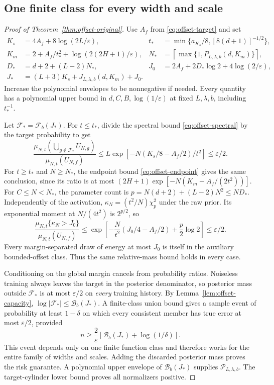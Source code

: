 \subsection{One finite class for every width and scale}
\begin{proof}[Proof of Theorem~\ref{thm:offset-original}]
Use $A_f$ from \eqref{eq:offset-target} and set
\begin{align*}
 K_s&=4A_f+8\log(2L/\varepsilon),&
 t_*&=\min\{a_{K_s}/8,[8(d+1)]^{-1/2}\},\\
 K_m&=2+A_f/t_*^2+\log(2(2H+1)/\varepsilon),&
 N_*&=\left\lceil\max\{1,P_{L,\lambda,b}(d,K_m)\}\right\rceil,\\
 D_*&=d+2+(L-2)N_*,&
 J_0&=2A_f+2D_*\log2+4\log(2/\varepsilon),\\
 J_*&=(L+3)K_s+J_{L,\lambda,b}(d,K_m)+J_0.
\end{align*}
Increase the polynomial envelopes to be nonnegative if needed. Every
quantity has a polynomial upper bound in $d,C,B,\log(1/\varepsilon)$
at fixed $L,\lambda,b$, including $t_*^{-1}$.

Let $\mathcal F_* =\mathcal F_b(J_*)$. For $t\le t_*$, divide the
spectral bound \eqref{eq:offset-spectral} by the target probability to get
\[
 \frac{\mu_{N,t}(\bigcup_{g\notin\mathcal F_*}U_{N,g})}
      {\mu_{N,t}(U_{N,f})}
 \le L\exp[-N(K_s/8-A_f/2)/t^2]\le\varepsilon/2.
\]
For $t\ge t_*$ and $N\ge N_*$, the endpoint bound
\eqref{eq:offset-endpoint} gives the same conclusion, since its ratio
is at most $(2H+1)\exp[-N(K_m-A_f/(2t^2))]$.
For $C\le N<N_*$, the parameter count is
$p=N(d+2)+(L-2)N^2\le ND_*$. Independently of the activation,
$\kappa_N=(t^2/N)\chi_p^2$ under the raw prior. Its exponential moment
at $N/(4t^2)$ is $2^{p/2}$, so
\[
 \frac{\mu_{N,t}\{\kappa_N>J_0\}}{\mu_{N,t}(U_{N,f})}
 \le \exp\left[-\frac N{t^2}(J_0/4-A_f/2)
                         +\frac p2\log2\right]\le\varepsilon/2.
\]
Every margin-separated draw of energy at most $J_0$ is itself in the
auxiliary bounded-offset class. Thus the same relative-mass bound holds
in every case.

Conditioning on the global margin cancels from probability ratios.
Noiseless training always leaves the target in the posterior denominator,
so posterior mass outside $\mathcal F_*$ is at most $\varepsilon/2$ on
\emph{every} training history. By Lemma~\ref{lem:offset-capacity},
$\log|\mathcal F_*|\le\mathcal B_b(J_*)$.
A finite-class union bound gives a sample event of probability at least
$1-\delta$ on which every consistent member has true error at most
$\varepsilon/2$, provided
\[
 n\ge\frac2\varepsilon[\mathcal B_b(J_*)+\log(1/\delta)].
\]
This event depends only on one finite function class and therefore works
for the entire family of widths and scales. Adding the discarded posterior
mass proves the risk guarantee. A polynomial upper envelope of
$\mathcal B_b(J_*)$ supplies $\mathcal P_{L,\lambda,b}$.
The target-cylinder lower bound proves all normalizers positive.
\end{proof}
